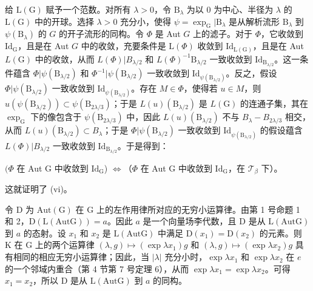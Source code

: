 给 \(\mathrm{L}(\mathrm{G})\) 赋予一个范数。对所有 \(\lambda > 0\)，令 \(\mathrm{B}_{\lambda}\) 为以 0 为中心、半径为 \(\lambda\) 的 \(\mathrm{L}(\mathrm{G})\) 中的开球。选择 \(\lambda > 0\) 充分小，使得 \(\psi = \exp_{\mathrm{G}}|\mathrm{B}_{\lambda}\) 是从解析流形 \(\mathrm{B}_{\lambda}\) 到 \(\psi(\mathrm{B}_{\lambda})\) 的 \(G\) 的开子流形的同构。令 \(\Phi\) 是 Aut \(G\) 上的滤子。对于 \(\Phi\)，它收敛到 \(\mathrm{Id}_{\mathrm{G}}\)，且是在 Aut \(G\) 中的收敛，充要条件是 \(\mathrm{L}(\Phi)\) 收敛到 \(\mathrm{Id}_{\mathrm{L}(\mathrm{G})}\)，且是在 Aut \(L(\mathrm{G})\) 中的收敛，从而 \(L(\Phi)|B_{\lambda/2}\) 和 \(L(\Phi)^{-1}\mathrm{B}_{\lambda/2}\) 一致收敛到 \(\mathrm{Id}_{\mathrm{B}_{\lambda/2}}\)。这一条件蕴含 \(\Phi|\psi(\mathrm{B}_{\lambda/2})\) 和 \(\Phi^{-1}|\psi(\mathrm{B}_{\lambda/2})\) 一致收敛到 \(\mathrm{Id}_{\psi(\mathrm{B}_{\lambda/2})}\)。反之，假设 \(\Phi|\psi(\mathrm{B}_{\lambda/2})\) 一致收敛到 \(\mathrm{Id}_{\psi(\mathrm{B}_{\lambda/2})}\)。存在 \(M \in \Phi\)，使得若 \(u \in M\)，则 \(u(\psi(\mathrm{B}_{\lambda/2})) \subset \psi(\mathrm{B}_{2\lambda/3})\)；于是 \(L(u)(\mathrm{B}_{\lambda/2})\) 是 \(L(\mathrm{G})\) 的连通子集，其在 \(\exp_{\mathrm{G}}\) 下的像包含于 \(\psi(\mathrm{B}_{2\lambda/3})\) 中，因此 \(L(u)(\mathrm{B}_{\lambda/2})\) 不与 \(B_{\lambda} - B_{2\lambda/3}\) 相交，从而 \(L(u)(\mathrm{B}_{\lambda/2}) \subset B_{\lambda}\)；于是 \(\Phi|\psi(\mathrm{B}_{\lambda/2})\) 一致收敛到 \(\mathrm{Id}_{\psi(\mathrm{B}_{\lambda/2})}\) 的假设蕴含 \(L(\Phi)|B_{\lambda/2}\) 一致收敛到 \(\mathrm{Id}_{\mathrm{B}_{\lambda/2}}\)。于是得到：

\((\Phi\) 在 Aut G 中收敛到 \(\mathrm{Id}_{\mathrm{G}}\)) \(\Leftrightarrow\)（\(\Phi\) 在 Aut G 中收敛到 \(\mathrm{Id}_{\mathrm{G}}\)，在 \(\mathcal{T}_{\beta}\) 下）。

这就证明了 (vi)。

令 D 为 \(\mathrm{Aut(G)}\) 在 G 上的左作用律所对应的无穷小运算律。由第 1 号命题 1 和 2，\(\mathrm{D(L(AutG))} = a\)。因此 \(a\) 是一个向量场李代数，且 D 是从 \(\mathrm{L(AutG)}\) 到 \(a\) 的态射。设 \(x_{1}\) 和 \(x_{2}\) 是 \(\mathrm{L(AutG)}\) 中满足 \(\mathrm{D}(x_1) = \mathrm{D}(x_2)\) 的元素。则 K 在 G 上的两个运算律 \((\lambda, g) \mapsto (\exp \lambda x_1)g\) 和 \((\lambda, g) \mapsto (\exp \lambda x_2)g\) 具有相同的相应无穷小运算律；因此，当 \(|\lambda|\) 充分小时，\(\exp \lambda x_1\) 和 \(\exp \lambda x_2\) 在 \(e\) 的一个邻域内重合（第 4 节第 7 号定理 6），从而 \(\exp \lambda x_1 = \exp \lambda x_2\)。可得 \(x_1 = x_2\)，所以 D 是从 \(\mathrm{L(AutG)}\) 到 \(a\) 的同构。

